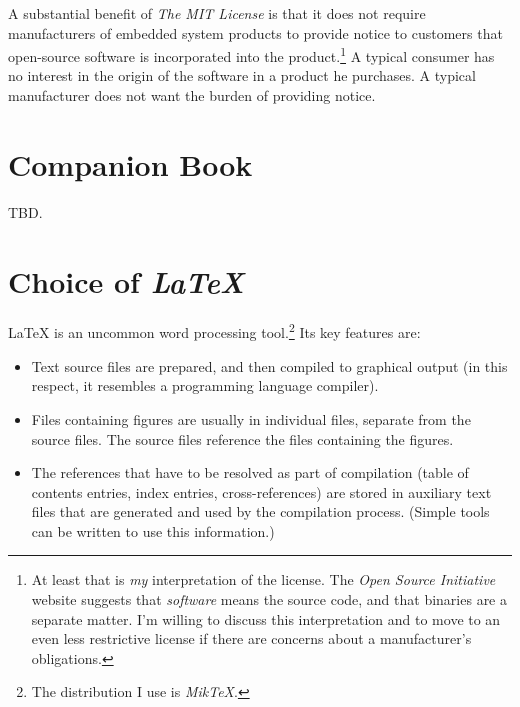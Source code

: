 A substantial benefit of \emph{The MIT License} is that it does not require manufacturers
of embedded system products to provide notice to customers that open-source
software is incorporated into the product.\footnote{At least that is \emph{my} interpretation
of the license.  The \emph{Open Source Initiative} website suggests that \emph{software} means
the source code, and that binaries are a separate matter.  I'm willing to discuss
this interpretation and to move to an even less restrictive license if there are
concerns about a manufacturer's obligations.}  A typical consumer has no interest in the
origin of the software in a product he purchases.  A typical manufacturer does not want
the burden of providing notice.

\section{Companion Book}
\label{ciov2:scbk0}

TBD.

\section{Choice of \emph{\LaTeX{}}}
\label{ciov2:sclt0}

\LaTeX{} is an uncommon word processing tool.\footnote{The distribution I use is
\emph{MikTeX}.}  Its key features are:

\begin{itemize}
   \item Text source files are prepared, and then compiled to graphical output (in this respect,
         it resembles a programming language compiler).
   \item Files containing figures are usually in individual files, separate from the source
         files.  The source files reference the files containing the figures.
   \item The references that have to be resolved as part of compilation (table of contents
         entries, index entries, cross-references) are stored in auxiliary text files that are
         generated and
         used by the compilation process.  (Simple tools can be written
         to use this information.)
\end{itemize}

